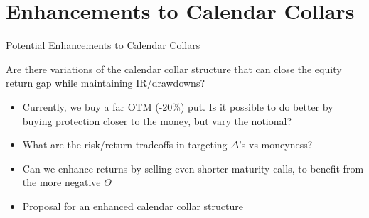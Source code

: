 \documentclass{beamer}
\begin{document}
\section{Enhancements to Calendar Collars}

\begin{frame}{Potential Enhancements to Calendar Collars}

\begin{block}{}
Are there variations of the calendar collar structure that can close the equity return gap while maintaining IR/drawdowns?
\end{block}

\begin{itemize}
\item Currently, we buy a far OTM (-20\%) put. Is it possible to do better by buying protection closer to the money, but vary the notional? 
\item What are the risk/return tradeoffs in targeting $\Delta$'s vs moneyness?
\item Can we enhance returns by selling even shorter maturity calls, to benefit from the more negative $\Theta$
\item Proposal for an enhanced calendar collar structure
\end{itemize}
\end{frame}
\end{document}
